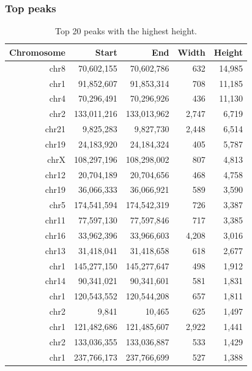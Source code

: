 \documentclass{article}
\begin{document}
\subsubsection{Top peaks}
{\scriptsize
\begin{longtable}{|r|r|r|r|r|}
\caption{Top 20 peaks with the highest height.} \\ 
  \hline
Chromosome & Start & End & Width & Height \\ 
  \hline
chr8 &  70,602,155 &  70,602,786 &   632 & 14,985 \\ 
   \rowcolor[gray]{0.9}chr1 &  91,852,607 &  91,853,314 &   708 & 11,185 \\ 
  chr4 &  70,296,491 &  70,296,926 &   436 & 11,130 \\ 
   \rowcolor[gray]{0.9}chr2 & 133,011,216 & 133,013,962 & 2,747 &  6,719 \\ 
  chr21 &   9,825,283 &   9,827,730 & 2,448 &  6,514 \\ 
   \rowcolor[gray]{0.9}chr19 &  24,183,920 &  24,184,324 &   405 &  5,787 \\ 
  chrX & 108,297,196 & 108,298,002 &   807 &  4,813 \\ 
   \rowcolor[gray]{0.9}chr12 &  20,704,189 &  20,704,656 &   468 &  4,758 \\ 
  chr19 &  36,066,333 &  36,066,921 &   589 &  3,590 \\ 
   \rowcolor[gray]{0.9}chr5 & 174,541,594 & 174,542,319 &   726 &  3,387 \\ 
  chr11 &  77,597,130 &  77,597,846 &   717 &  3,385 \\ 
   \rowcolor[gray]{0.9}chr16 &  33,962,396 &  33,966,603 & 4,208 &  3,016 \\ 
  chr13 &  31,418,041 &  31,418,658 &   618 &  2,677 \\ 
   \rowcolor[gray]{0.9}chr1 & 145,277,150 & 145,277,647 &   498 &  1,912 \\ 
  chr14 &  90,341,021 &  90,341,601 &   581 &  1,831 \\ 
   \rowcolor[gray]{0.9}chr1 & 120,543,552 & 120,544,208 &   657 &  1,811 \\ 
  chr2 &       9,841 &      10,465 &   625 &  1,497 \\ 
   \rowcolor[gray]{0.9}chr1 & 121,482,686 & 121,485,607 & 2,922 &  1,441 \\ 
  chr2 & 133,036,355 & 133,036,887 &   533 &  1,429 \\ 
   \rowcolor[gray]{0.9}chr1 & 237,766,173 & 237,766,699 &   527 &  1,388 \\ 
   \hline
\hline
\end{longtable}
}
\end{document}
